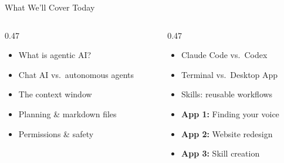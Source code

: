 \documentclass[aspectratio=169, 10pt]{beamer}
\begin{document}
\begin{frame}{What We'll Cover Today}
\begin{columns}[T]
\begin{column}{0.47\textwidth}
\begin{tcolorbox}[keybox, title={\faMap\quad Concepts}]
\small
\begin{itemize}\setlength{\itemsep}{2pt}
  \item What is agentic AI?
  \item Chat AI vs.\ autonomous agents
  \item The context window
  \item Planning \& markdown files
  \item Permissions \& safety
\end{itemize}
\end{tcolorbox}
\end{column}
\begin{column}{0.47\textwidth}
\begin{tcolorbox}[keybox, title={\faLaptopCode\quad Hands-On}]
\small
\begin{itemize}\setlength{\itemsep}{2pt}
  \item Claude Code vs.\ Codex
  \item Terminal vs.\ Desktop App
  \item Skills: reusable workflows
  \item \textbf{App 1:} Finding your voice
  \item \textbf{App 2:} Website redesign
  \item \textbf{App 3:} Skill creation
\end{itemize}
\end{tcolorbox}
\end{column}
\end{columns}
\vfill
\begin{center}
\end{center}
\end{frame}
\end{document}
